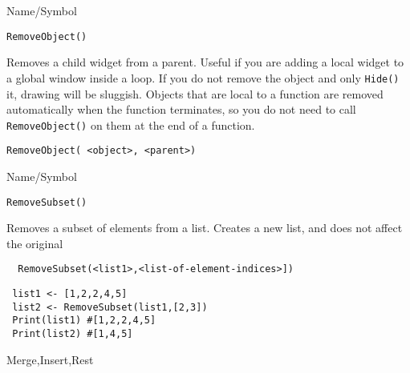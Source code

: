 \rl



\begin{desc}{Name/Symbol}
\item[Name/Symbol]	\verb+RemoveObject()+

\item[Description] Removes a child widget from a parent.  Useful if
  you are adding a local widget to a global window inside a loop.  If
  you do not remove the object and only \verb+Hide()+ it, drawing will
  be sluggish.  Objects that are local to a function are removed
  automatically when the function terminates, so you do not need to
  call \verb+RemoveObject()+ on them at the end of a function.

\item[Usage]
\begin{verbatim}
RemoveObject( <object>, <parent>)
\end{verbatim}

\item[Example]	

\item[See Also]	
\end{desc}

\rl



\begin{desc}{Name/Symbol}
\item[Name/Symbol]	\verb+RemoveSubset()+

\item[Description] Removes a subset of elements from a list. Creates
a new list, and does not affect the original

\item[Usage]
\begin{verbatim}
  RemoveSubset(<list1>,<list-of-element-indices>])
\end{verbatim}

\item[Example]	
\begin{verbatim}
 list1 <- [1,2,2,4,5]
 list2 <- RemoveSubset(list1,[2,3])
 Print(list1) #[1,2,2,4,5]
 Print(list2) #[1,4,5]
\end{verbatim}

\item[See Also]	
Merge,Insert,Rest
\end{desc}

\rl



